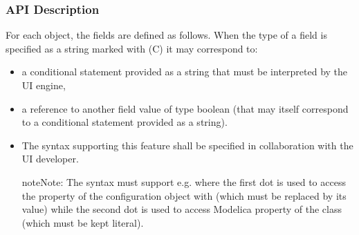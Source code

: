 \documentclass[letterpaper,10pt, openany,english]{sphinxmanual}
\begin{document}
\subsubsection{API Description}
\label{\detokenize{requirements:api-description}}
For each object, the fields are defined as follows. When the type of a field is specified as a string marked with (C) it may correspond to:
\begin{itemize}
\item {} 
a conditional statement provided as a string that must be interpreted by the UI engine,

\item {} 
a reference to another field value of type boolean (that may itself correspond to a conditional statement provided as a string).

\item {} 
The syntax supporting this feature shall be specified in collaboration with the UI developer.

\begin{sphinxadmonition}{note}{Note:}
The syntax must support e.g.  where the first dot is used to access the property  of the configuration object with  (which must be replaced by its value) while the second dot is used to access Modelica property  of the class  (which must be kept literal).
\end{sphinxadmonition}

\end{itemize}
\label{\detokenize{requirements:configuration-api}}
\end{document}
